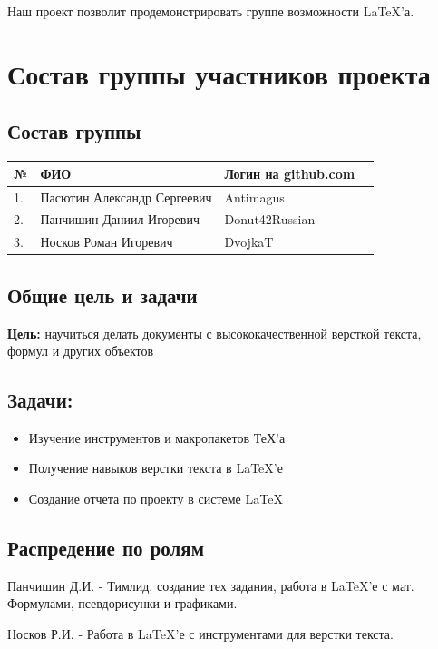\documentclass{article}
\begin{document}
	
	\noindent Наш проект позволит продемонстрировать группе возможности LaTeX’а.
	
\section{Состав группы участников проекта}
\subsection*{Состав группы}
\begin{tabular}{| l | l | l |p{5cm}|}
\hline
№ & ФИО & Логин на github.com \\
\hline
1. & Пасютин Александр Сергеевич & Antimagus \\
\hline
2. & Панчишин Даниил Игоревич & Donut42Russian \\
\hline
3. & Носков Роман Игоревич & DvojkaT \\
\hline
\end{tabular}
\subsection*{Общие цель и задачи}

\noindent\textbf{Цель:} научиться делать документы с высококачественной версткой текста, формул и других объектов

\subsection*{Задачи:}

\begin{itemize}
	\item Изучение инструментов и макропакетов ТеХ'а
	
	\item Получение навыков верстки текста в LaTeX’е
	
	\item Создание отчета по проекту в системе LaTeX
\end{itemize}
\subsection*{Распредение по ролям}
Панчишин Д.И. - Тимлид, создание тех задания, работа в LaTeX’е с мат. Формулами, псевдорисунки и графиками.

\vspace{\baselineskip}
Носков Р.И. - Работа в LaTeX’е с инструментами для верстки текста.
\end{document}
